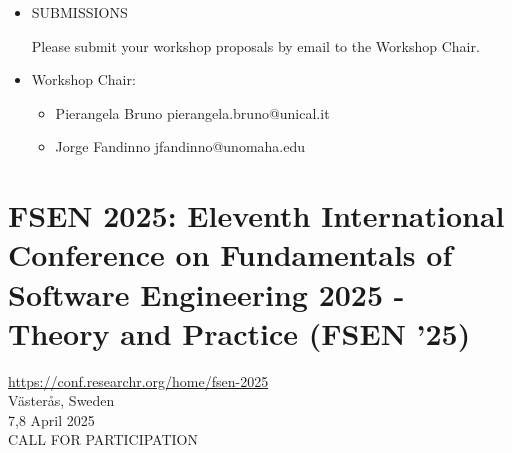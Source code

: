 \documentclass[prodmode,acmtecs]{acmsmall} %
\begin{document}
\begin{itemize}
\item  SUBMISSIONS 
 
  Please submit your workshop proposals by email to the Workshop Chair. 
 
\item  Workshop Chair: 
 
\begin{itemize}\item  Pierangela Bruno    pierangela.bruno@unical.it
\item  Jorge Fandinno       jfandinno@unomaha.edu
\end{itemize} 
\end{itemize}\section{FSEN 2025: Eleventh International Conference on Fundamentals of Software Engineering 2025 - Theory and Practice (FSEN '25) }\label{FSEN2025}  \href{https://conf.researchr.org/home/fsen-2025}{https://conf.researchr.org/home/fsen-2025}\\ 
  Västerås, Sweden\\ 
  7,8 April 2025\\ 
CALL FOR PARTICIPATION 
\end{document}

